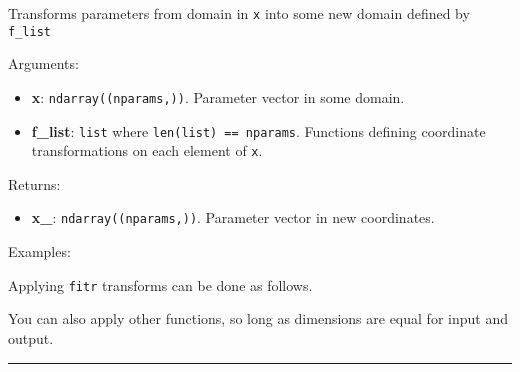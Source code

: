 Transforms parameters from domain in \texttt{x} into some new domain
defined by \texttt{f\_list}

Arguments:

\begin{itemize}
\tightlist
\item
  \textbf{x}: \texttt{ndarray((nparams,))}. Parameter vector in some
  domain.
\item
  \textbf{f\_list}: \texttt{list} where \texttt{len(list)\ ==\ nparams}.
  Functions defining coordinate transformations on each element of
  \texttt{x}.
\end{itemize}

Returns:

\begin{itemize}
\tightlist
\item
  \textbf{x\_}: \texttt{ndarray((nparams,))}. Parameter vector in new
  coordinates.
\end{itemize}

Examples:

Applying \texttt{fitr} transforms can be done as follows.

\begin{Shaded}
\begin{Highlighting}[]

\OperatorTok{=}\NormalTok{, }\OperatorTok{=}\NormalTok{)}
\OperatorTok{=}
\end{Highlighting}
\end{Shaded}

You can also apply other functions, so long as dimensions are equal for
input and output.

\begin{Shaded}
\begin{Highlighting}[]

\OperatorTok{=}\NormalTok{, }\OperatorTok{=}\NormalTok{)}
\OperatorTok{=}
\end{Highlighting}
\end{Shaded}

\begin{center}\rule{0.5\linewidth}{\linethickness}\end{center}
